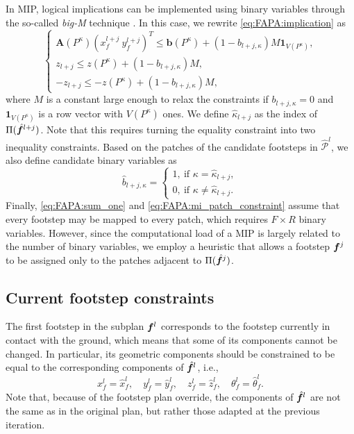 In MIP, logical implications can be implemented using binary variables through
the so-called {\em big-M} technique
\cite{Afonso2020TaskAllocationTrajectoryPlanning}. In this case, we rewrite
\eqref{eq:FAPA:implication} as
\begin{equation}
	\begin{cases}
		\bm{A}(P^\kappa)\left( x_f^{l+j} \ y_f^{l+j} \right)^T \leq \bm{b}(P^\kappa) + (1 - b_{l+j,\kappa}) M \bm{1}_{V(P^\kappa)}, \\
		z_{l+j} \leq z(P^\kappa) + (1 - b_{l+j,\kappa}) M, \\
		-z_{l+j} \leq -z(P^\kappa) + (1 - b_{l+j,\kappa}) M,
	\end{cases}
\label{eq:FAPA:mi_patch_constraint}
\end{equation}
where $M$ is a constant large enough to relax the constraints if
$b_{l+j,\kappa}=0$ and $\bm{1}_{V(P^\kappa)}$ is a row vector with
$V(P^\kappa)$ ones. We define $\hat \kappa_{l+j}$ as the index of
$\Pi(\hat {{\bm{f}}}^{l+j})$. Note that this requires turning the equality constraint
into two inequality constraints. Based on the patches of the candidate footsteps
in $\mathcal{\hat P}^l$, we also define candidate binary variables as
\begin{equation*}
    \hat b_{l+j,\kappa} =
    \begin{cases}
        1, \ \text{if } \kappa = \hat \kappa_{l+j}, \\
        0, \ \text{if } \kappa \neq \hat \kappa_{l+j}.
    \end{cases}
\end{equation*}
Finally, \eqref{eq:FAPA:sum_one} and \eqref{eq:FAPA:mi_patch_constraint}
assume that every footstep may be mapped to every patch, which requires
$F \times R$ binary variables. However, since the computational load of a
MIP is largely related to the number of binary variables, we employ a heuristic
that allows a footstep ${\bm{f}}^j$ to be assigned only to the patches adjacent to
$\Pi(\hat {{\bm{f}}}^j)$.

\subsection{Current footstep constraints}

The first footstep in the subplan ${\bm{f}}^l$ corresponds to the footstep
currently in contact with the ground, which means that some of its components
cannot be changed. In particular, its geometric components should be
constrained to be equal to the corresponding components of $\hat{{\bm{f}}}^l$, i.e.,
\begin{equation}
    x_f^l = \hat x_f^l, \quad
    y_f^l = \hat y_f^l, \quad
    z_f^l = \hat z_f^l, \quad
    \theta_f^l = \hat \theta_f^l.
    \label{eq:FAPA:current_geometric_constraint}
\end{equation}
Note that, because of the footstep plan override, the components of
$\hat{{\bm{f}}}^l$ are not the same as in the original plan, but rather those
adapted at the previous iteration.

